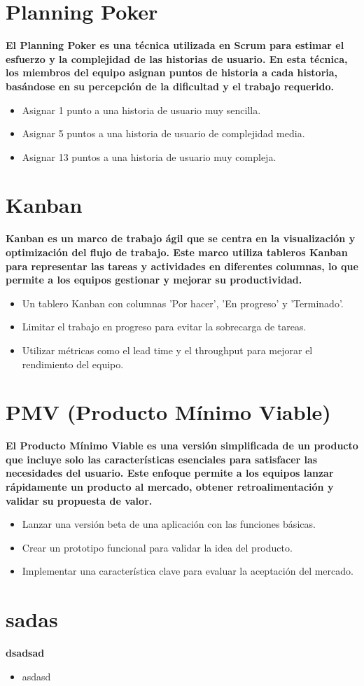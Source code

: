 \documentclass[twocolumn]{article}
\begin{document}
\section*{Planning Poker}
\textbf{El Planning Poker es una técnica utilizada en Scrum para estimar el esfuerzo y la complejidad de las historias de usuario. En esta técnica, los miembros del equipo asignan puntos de historia a cada historia, basándose en su percepción de la dificultad y el trabajo requerido.}
\begin{itemize}[label=\textbullet]
\item Asignar 1 punto a una historia de usuario muy sencilla.
\item Asignar 5 puntos a una historia de usuario de complejidad media.
\item Asignar 13 puntos a una historia de usuario muy compleja.
\end{itemize}
\section*{Kanban}
\textbf{Kanban es un marco de trabajo ágil que se centra en la visualización y optimización del flujo de trabajo. Este marco utiliza tableros Kanban para representar las tareas y actividades en diferentes columnas, lo que permite a los equipos gestionar y mejorar su productividad.}
\begin{itemize}[label=\textbullet]
\item Un tablero Kanban con columnas 'Por hacer', 'En progreso' y 'Terminado'.
\item Limitar el trabajo en progreso para evitar la sobrecarga de tareas.
\item Utilizar métricas como el lead time y el throughput para mejorar el rendimiento del equipo.
\end{itemize}
\section*{PMV (Producto Mínimo Viable)}
\textbf{El Producto Mínimo Viable es una versión simplificada de un producto que incluye solo las características esenciales para satisfacer las necesidades del usuario. Este enfoque permite a los equipos lanzar rápidamente un producto al mercado, obtener retroalimentación y validar su propuesta de valor.}
\begin{itemize}[label=\textbullet]
\item Lanzar una versión beta de una aplicación con las funciones básicas.
\item Crear un prototipo funcional para validar la idea del producto.
\item Implementar una característica clave para evaluar la aceptación del mercado.
\end{itemize}
\section*{sadas}
\textbf{dsadsad}
\begin{itemize}[label=\textbullet]
\item asdasd
\end{itemize}
\end{document}
